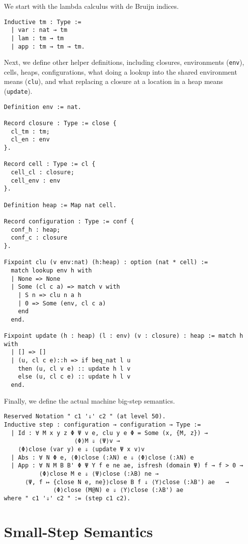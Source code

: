 We start with the lambda calculus with de Bruijn indices.

\begin{verbatim}
Inductive tm : Type := 
  | var : nat → tm 
  | lam : tm → tm
  | app : tm → tm → tm.
\end{verbatim}

Next, we define other helper definitions, including closures, environments
(\texttt{env}), cells, heaps, configurations, what doing a lookup into the
shared environment means (\texttt{clu}), and what replacing a closure at a
location in a heap means (\texttt{update}).

\begin{verbatim}
Definition env := nat.

Record closure : Type := close {
  cl_tm : tm;
  cl_en : env
}.

Record cell : Type := cl {
  cell_cl : closure;
  cell_env : env
}.

Definition heap := Map nat cell.

Record configuration : Type := conf {
  conf_h : heap;
  conf_c : closure
}.

Fixpoint clu (v env:nat) (h:heap) : option (nat * cell) := 
  match lookup env h with
  | None => None
  | Some (cl c a) => match v with
    | S n => clu n a h
    | 0 => Some (env, cl c a)
    end
  end.

Fixpoint update (h : heap) (l : env) (v : closure) : heap := match h with 
  | [] => []
  | (u, cl c e)::h => if beq_nat l u 
    then (u, cl v e) :: update h l v 
    else (u, cl c e) :: update h l v
  end.
\end{verbatim}
Finally, we define the actual machine big-step semantics.
\begin{verbatim}
Reserved Notation " c1 '⇓' c2 " (at level 50).
Inductive step : configuration → configuration → Type :=
  | Id : ∀ M x y z Φ Ψ v e, clu y e Φ = Some (x, {M, z}) → 
                    ⟨Φ⟩M ⇓ ⟨Ψ⟩v →
    ⟨Φ⟩close (var y) e ⇓ ⟨update Ψ x v⟩v
  | Abs : ∀ N Φ e, ⟨Φ⟩close (:λN) e ⇓ ⟨Φ⟩close (:λN) e
  | App : ∀ N M B B' Φ Ψ Υ f e ne ae, isfresh (domain Ψ) f → f > 0 →
          ⟨Φ⟩close M e ⇓ ⟨Ψ⟩close (:λB) ne → 
      ⟨Ψ, f ↦ {close N e, ne}⟩close B f ⇓ ⟨Υ⟩close (:λB') ae   →
              ⟨Φ⟩close (M@N) e ⇓ ⟨Υ⟩close (:λB') ae
where " c1 '⇓' c2 " := (step c1 c2).
\end{verbatim}

\section{Small-Step \ce Semantics}

